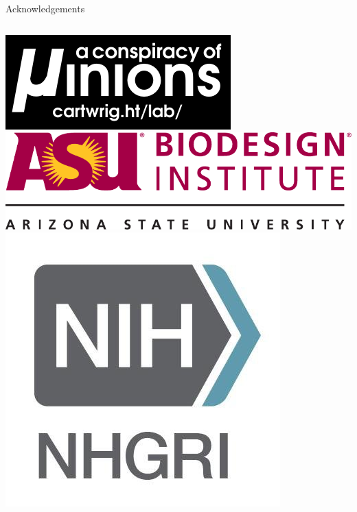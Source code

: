 \documentclass{beamer}
\begin{document}
\begin{frame}{}
\begin{columns}
\begin{block}{Acknowledgements}
\begin{center}
\begin{columns}
\includegraphics[width=\linewidth]{lab_logo.pdf}
\includegraphics[width=\linewidth]{biodesign_logo.pdf}
\includegraphics[width=\linewidth]{nih-nhgri-official-logo.jpg}
\end{columns}

\end{center}

\end{block}

\end{columns}
\end{frame}
\end{document}
